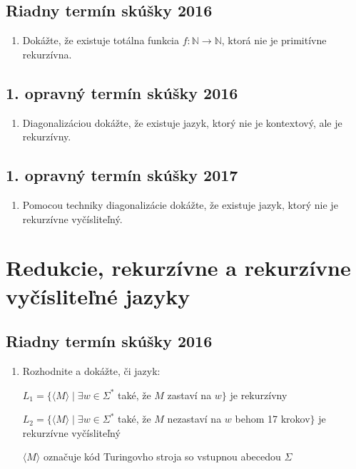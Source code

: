 \documentclass[11pt,a4paper]{article}
\begin{document}
		\subsection{Riadny termín skúšky 2016}
		
		\begin{enumerate}
			\item  Dokážte, že existuje totálna funkcia $f: \mathbb{N} \rightarrow \mathbb{N}$, ktorá nie je primitívne rekurzívna.
		\end{enumerate}
	
		\subsection{1. opravný termín skúšky 2016}
		
		\begin{enumerate}
			\item Diagonalizáciou dokážte, že existuje jazyk, ktorý nie je kontextový, ale je rekurzívny.
		\end{enumerate}

		\subsection{1. opravný termín skúšky 2017}

		\begin{enumerate}
			\item Pomocou techniky diagonalizácie dokážte, že existuje jazyk, ktorý nie je rekurzívne vyčísliteľný.
		\end{enumerate}
	
	\section{Redukcie, rekurzívne a rekurzívne vyčísliteľné jazyky}
	
		\subsection{Riadny termín skúšky 2016}
		
		\begin{enumerate}
			\item Rozhodnite a dokážte, či jazyk:
			
			$L_1 = \{\langle M \rangle \mid \exists w \in \Sigma^*$ také, že $M$ zastaví na $w\}$ je rekurzívny
			
			$L_2 = \{\langle M \rangle \mid \exists w \in \Sigma^*$ také, že $M$ nezastaví na $w$ behom 17 krokov$\}$ je rekurzívne vyčísliteľný
			
			$\langle M \rangle$ označuje kód Turingovho stroja so vstupnou abecedou $\Sigma$
		\end{enumerate}	
		
\end{document}
